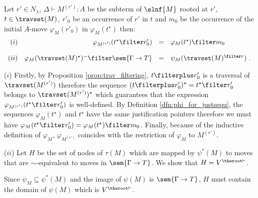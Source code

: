 \begin{lemma}
\label{lem:varphi_filter} Let $r'\in N_\lambda$, $\Delta \vdash M^{(r')} :
A$ be the subterm of $\elnf{M}$ rooted at $r'$, $t\in\travset(M)$,
$r'_0$ be an occurrence of $r'$ in $t$ and $m_0$ be the occurrence
of the initial $A$-move $\varphi_M(r'_0)$ in $\varphi_M(t^\star)$ then:
$$\begin{array}{rrcl}
(i)& \varphi_{M^{(r')}}(t^\star \filter r'_0) &=& \varphi_M(t^\star) \filter m_0 \\ \\
(ii) & \varphi_M(\travset(M)^\star)^- \filter \sem{\Gamma \rightarrow T} &=& \psi_M(\travset(M)^{\filter r})\ .
\end{array}
$$
\end{lemma}
\proof ($i$) Firstly, by Proposition \ref{prop:trav_filtering},
$t\filterplus r'_0$ is a traversal of $\travset(M^{(r')})$ therefore
the sequence $(t\filterplus r'_0)^\star = t^\star \filter r'_0$
belongs to $\travset(M^{(r')})^\star$ which guarantees that the
expression $\varphi_{M^{(r')}}(t^\star \filter r'_0)$ is
well-defined. By Definition \ref{dfn:phi_for_justsequ}, the
sequences $\varphi_M(t^\star)$ and $t^\star$ have the same
justification pointers therefore
 we must have $\varphi_{M}(t^\star \filter r'_0) = \varphi_M(t^\star) \filter m_0$. Finally, because of the inductive definition of $\varphi_{M}$, $\varphi_{M^{(r')}}$ coincides with
the restriction of $\varphi_{M}$ to $M^{(r')}$.


($ii$) Let $H$ be the set of nodes of $\tau(M)$ which are mapped by
$\psi^*(M)$ to moves that are $\sim$-equivalent to moves in
$\sem{\Gamma \rightarrow T}$. We show that $H = V^{\theroot\vdash}$.

Since $\psi_M \subseteq \psi^*(M)$ and the image of $\psi(M)$ is
$\sem{\Gamma \rightarrow T}$, $H$ must contain the domain of
$\psi(M)$ which is $V^{\theroot\vdash}$.

